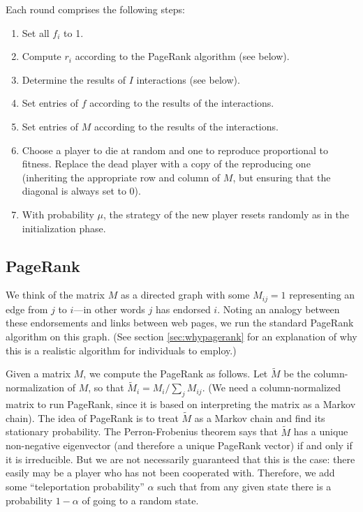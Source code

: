 \documentclass{amsart}
\begin{document}
Each round comprises the following steps:

\begin{enumerate}
\item Set all $f_i$ to 1.
\item Compute $r_i$ according to the PageRank algorithm (see below).
\item Determine the results of $I$ interactions (see below).
\item Set entries of $f$ according to the results of the interactions.
\item Set entries of $M$ according to the results of the interactions.
\item Choose a player to die at random and one to reproduce
  proportional to fitness. Replace the dead player with a copy of the
  reproducing one (inheriting the appropriate row and column of $M$,
  but ensuring that the diagonal is always set to 0).
\item With probability $\mu$, the strategy of the new player resets
  randomly as in the initialization phase.
\end{enumerate}

\subsection{PageRank}
\newcommand{\tM}{\tilde M} We think of the matrix $M$ as a directed
graph with some $M_{ij} = 1$ representing an edge from $j$ to $i$---in
other words $j$ has endorsed $i$. Noting an analogy between these
endorsements and links between web pages, we run the standard PageRank
algorithm \cite{page_pagerank_1999} on this graph. (See section
\ref{sec:whypagerank} for an explanation of why this is a realistic
algorithm for individuals to employ.)

Given a matrix $M$, we compute the PageRank as follows. Let $\tM$ be
the column-normalization of $M$, so that $\tM_i = M_i / \sum_j
M_{ij}$. (We need a column-normalized matrix to run PageRank, since it
is based on interpreting the matrix as a Markov chain). The idea of
PageRank is to treat $\tM$ as a Markov chain and find its stationary
probability. The Perron-Frobenius theorem says that $\tM$ has a unique
non-negative eigenvector (and therefore a unique PageRank vector) if
and only if it is irreducible. But we are not necessarily guaranteed
that this is the case: there easily may be a player who has not been
cooperated with. Therefore, we add some ``teleportation probability''
$\alpha$ such that from any given state there is a probability
$1-\alpha$ of going to a random state.
\end{document}
